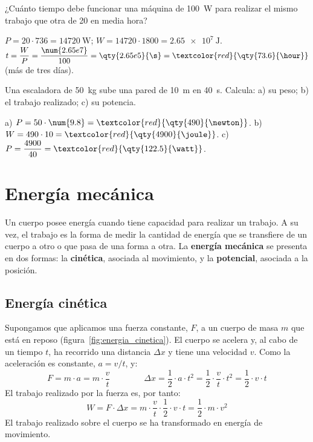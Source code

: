 \begin{exercise}
    ¿Cuánto tiempo debe funcionar una máquina de \qty{100}{\watt} para realizar el mismo trabajo que otra de \qty{20}{\CV} en media hora?
    \begin{solu}
        \(P = 20 \cdot 736 = \qty{14720}{\watt}\); \(W = 14720 \cdot 1800 = \qty{2.65e7}{\joule}\).
        \(t = \dfrac{W}{P} = \dfrac{\num{2.65e7}}{100} = \qty{2.65e5}{\s} = \textcolor{red}{\qty{73.6}{\hour}}\) (más de tres días).
    \end{solu}
\end{exercise}

\begin{exercise}
    Una escaladora de \qty{50}{\kg} sube una pared de \qty{10}{\m} en \qty{40}{\s}. Calcula: a) su peso; b) el trabajo realizado; c) su potencia.
    \begin{solu}
        a) \(P = 50 \cdot \num{9.8} = \textcolor{red}{\qty{490}{\newton}}\). b) \(W = 490 \cdot 10 = \textcolor{red}{\qty{4900}{\joule}}\). c) \(P = \dfrac{4900}{40} = \textcolor{red}{\qty{122.5}{\watt}}\).
    \end{solu}
\end{exercise}

\section{Energía mecánica}

Un cuerpo posee energía cuando tiene capacidad para realizar un trabajo. A su vez, el trabajo es la forma de medir la cantidad de energía que se transfiere de un cuerpo a otro o que pasa de una forma a otra. La \textbf{energía mecánica} se presenta en dos formas: la \textbf{cinética}, asociada al movimiento, y la \textbf{potencial}, asociada a la posición.

\subsection{Energía cinética}

Supongamos que aplicamos una fuerza constante, \(F\), a un cuerpo de masa \(m\) que está en reposo (figura~\ref{fig:energia_cinetica}). El cuerpo se acelera y, al cabo de un tiempo \(t\), ha recorrido una distancia \(\Delta x\) y tiene una velocidad \(v\). Como la aceleración es constante, \(a = v/t\), y:
\[ F = m \cdot a = m \cdot \frac{v}{t} \qquad\qquad \Delta x = \frac{1}{2} \cdot a \cdot t^2 = \frac{1}{2} \cdot \frac{v}{t} \cdot t^2 = \frac{1}{2} \cdot v \cdot t \]
El trabajo realizado por la fuerza es, por tanto:
\[ W = F \cdot \Delta x = m \cdot \frac{v}{t} \cdot \frac{1}{2} \cdot v \cdot t = \frac{1}{2} \cdot m \cdot v^2 \]
El trabajo realizado sobre el cuerpo se ha transformado en energía de movimiento.

